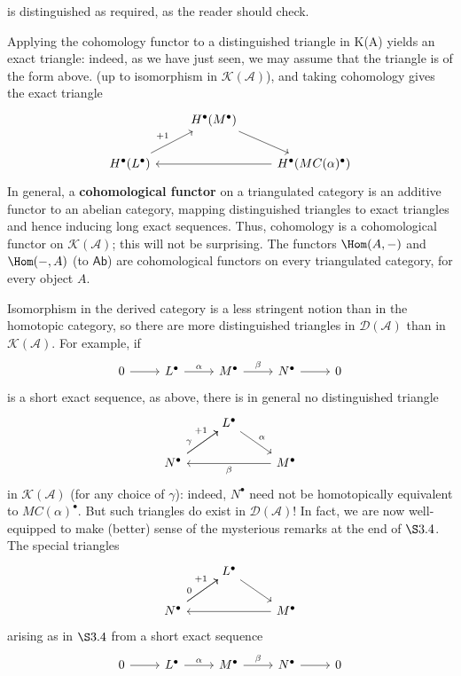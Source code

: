 is distinguished as required, as the reader should check.\par
Applying the cohomology functor to a distinguished triangle in K(A) yields an exact triangle: indeed, as we have just seen, we may assume that the triangle is of the form above. (up to isomorphism in $\mathcal{K}(\mathcal{A})$), and taking cohomology gives the exact triangle
\[\begin{tikzcd}
&H^\bullet(M^\bullet)\ar[rd]&\\
H^\bullet(L^\bullet)\ar[ru,"+1"]&&H^\bullet(MC(\alpha)^\bullet)\ar[ll]
\end{tikzcd}\]
In general, a \textbf{cohomological functor} on a triangulated category is an additive functor to an abelian category, mapping distinguished triangles to exact triangles and hence inducing long exact sequences. Thus, cohomology is a cohomological functor on $\mathcal{K}(\mathcal{A})$; this will not be surprising. The functors $\Hom(A,-)$ and $\Hom(-,A)$ (to $\mathsf{Ab}$) are cohomological functors on every triangulated category, for every object $A$.\par
Isomorphism in the derived category is a less stringent notion than in the homotopic category, so there are more distinguished triangles in $\mathcal{D}(\mathcal{A})$ than in $\mathcal{K}(\mathcal{A})$. For example, if
\[\begin{tikzcd}
0\ar[r]&L^\bullet\ar[r,"\alpha"]&M^\bullet\ar[r,"\beta"]&N^\bullet\ar[r]&0
\end{tikzcd}\]
is a short exact sequence, as above, there is in general no distinguished triangle
\[\begin{tikzcd}
&L^\bullet\ar[rd,"\alpha"]&\\
N^\bullet\ar[ru,near start,"\gamma"]\ar[ru,near end,"+1"]&&M^\bullet\ar[ll,"\beta"]
\end{tikzcd}\]
in $\mathcal{K}(\mathcal{A})$ (for any choice of $\gamma$): indeed, $N^\bullet$ need not be homotopically equivalent to $MC(\alpha)^\bullet$. But such triangles do exist in $\mathcal{D}(\mathcal{A})$! In fact, we are now well-equipped to make (better) sense of the mysterious remarks at the end of $\S3.4$. The special triangles
\[\begin{tikzcd}
&L^\bullet\ar[rd]&\\
N^\bullet\ar[ru,near start,"0"]\ar[ru,near end,"+1"]&&M^\bullet\ar[ll]
\end{tikzcd}\]
arising as in $\S3.4$ from a short exact sequence
\[\begin{tikzcd}
0\ar[r]&L^\bullet\ar[r,"\alpha"]&M^\bullet\ar[r,"\beta"]&N^\bullet\ar[r]&0
\end{tikzcd}\]
